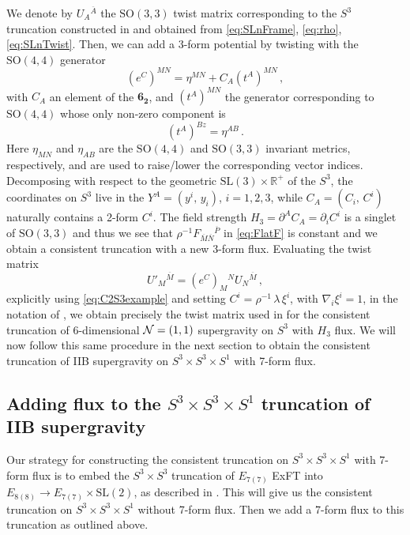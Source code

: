 \documentclass[a4paper, 11pt]{article}
\numberwithin{equation}{section}
\newcommand{\ov}[1]{\overline{#1}}
\newcommand{\SL}[1]{\mathrm{SL}( #1 )}
\newcommand{\SO}[1]{\mathrm{SO}( #1 )}
\newcommand{\EE}{\ensuremath{E_{8(8)}}\xspace}
\newcommand{\En}[1]{E_{#1(#1)}}
\newcommand{\+}{\oplus}
\begin{document}
We denote by $U_A{}^{\ov{A}}$ the $\SO{3,3}$ twist matrix corresponding to the $S^3$ truncation constructed in \cite{Lee:2014mla,Baguet:2015iou} and obtained from \eqref{eq:SLnFrame}, \eqref{eq:rho}, \eqref{eq:SLnTwist}. Then, we can add a 3-form potential by twisting with the $\SO{4,4}$ generator
\begin{equation} \label{eq:C2S3example}
	(e^C)^{MN} = \eta^{MN} + C_A \left( t^A \right)^{MN} \,,
\end{equation}
with $C_A$ an element of the $\mathbf{6_{2}}$, and $\left( t^A \right)^{MN}$ the generator corresponding to $\SO{4,4}$ whose only non-zero component is
\begin{equation}
	\left(t^A\right)^{Bz} = \eta^{AB} \,.
\end{equation}
Here $\eta_{MN}$ and $\eta_{AB}$ are the $\SO{4,4}$ and $\SO{3,3}$ invariant metrics, respectively, and are used to raise/lower the corresponding vector indices. Decomposing with respect to the geometric $\SL{3} \times \mathbb{R}^+$ of the $S^3$,  the coordinates on $S^3$ live in the $Y^A = \left( y^i,\, y_i \right)$, $i = 1, 2, 3$, while $C_A = \left( C_i,\, C^i \right)$ naturally contains a 2-form $C^i$. The field strength $H_3 = \partial^A C_A = \partial_i C^i$ is a singlet of $\SO{3,3}$ and thus we see that $\rho^{-1} F_{\ov{M}\ov{N}}{}^{\ov{P}}$ in \eqref{eq:FlatF} is constant and we obtain a consistent truncation with a new 3-form flux. Evaluating the twist matrix
\begin{equation}
	U'_M{}^{\ov{M}} = (e^C)_M{}^N  U_N{}^{\ov{M}} \,,
\end{equation}
explicitly using \eqref{eq:C2S3example} and setting $C^i = \rho^{-1}\,\lambda\, \xi^i$, with $\nabla_i \xi^i = 1$, in the notation of \cite{Eloy:2021fhc}, we obtain precisely the twist matrix used in \cite{Eloy:2021fhc} for the consistent truncation of 6-dimensional ${\cal N}=(1,1)$ supergravity on $S^3$ with $H_3$ flux. 
We will now follow this same procedure in the next section to obtain the consistent truncation of IIB supergravity on $S^3 \times S^3 \times S^1$ with 7-form flux.

\subsection{Adding flux to the $S^3 \times S^3 \times S^1$ truncation of IIB supergravity}
Our strategy for constructing the consistent truncation on $S^3 \times S^3 \times S^1$ with 7-form flux is to embed the $S^3 \times S^3$ truncation of $\En{7}$ ExFT \cite{Inverso:2016eet} into $\EE \rightarrow \En{7} \times \SL{2}$, as described in \cite{Galli:2022idq}. This will give us the consistent truncation on $S^3 \times S^3 \times S^1$ without 7-form flux. Then we add a 7-form flux to this truncation as outlined above.
\end{document}

